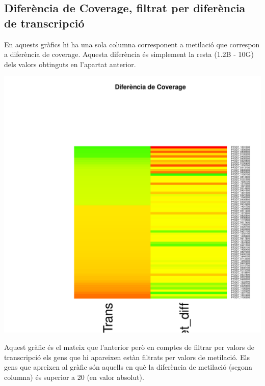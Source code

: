 \documentclass{article}\usepackage[]{graphicx}\usepackage[]{color}
\newenvironment{knitrout}{}{} %
\begin{document}
\subsection{Diferència de Coverage, filtrat per diferència de transcripció}
En aquests gràfics hi ha una sola columna corresponent a metilació que correspon a diferència de coverage. Aquesta diferència és simplement la resta (1.2B - 10G) dels valors obtinguts en l'apartat anterior.
\begin{knitrout}
\color{fgcolor}

{\centering \includegraphics[width=.9\linewidth]{figure/minimal-_heat_cov_diff-1} 

}



\end{knitrout}
\clearpage
Aquest gràfic és el mateix que l'anterior però en comptes de filtrar per valors de transcripció els gens que hi apareixen estàn filtrats per valors de metilació. Els gens que apreixen al gràfic són aquells en què la diferència de metilació (segona columna) és superior a 20 (en valor absolut).
\end{document}
